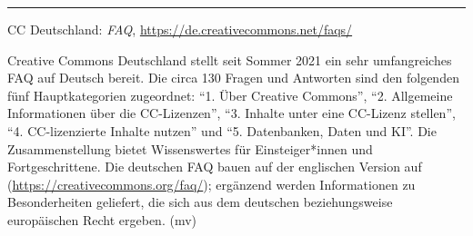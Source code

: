 \documentclass[a4paper,
fontsize=11pt,
oneside,
numbers=noperiodatend,
parskip=half-,
bibliography=totoc,
final
]{scrartcl}
\begin{document}
\begin{center}\rule{0.5\linewidth}{0.5pt}\end{center}

CC Deutschland: \emph{FAQ}, \url{https://de.creativecommons.net/faqs/}

Creative Commons Deutschland stellt seit Sommer 2021 ein sehr
umfangreiches FAQ auf Deutsch bereit. Die circa 130 Fragen und Antworten
sind den folgenden fünf Hauptkategorien zugeordnet: \enquote{1. Über
Creative Commons}, \enquote{2. Allgemeine Informationen über die
CC-Lizenzen}, \enquote{3. Inhalte unter eine CC-Lizenz stellen},
\enquote{4. CC-lizenzierte Inhalte nutzen} und \enquote{5. Datenbanken,
Daten und KI}. Die Zusammenstellung bietet Wissenswertes für
Einsteiger*innen und Fortgeschrittene. Die deutschen FAQ bauen auf der
englischen Version auf
(\url{https://creativecommons.org/faq/});
ergänzend werden Informationen zu Besonderheiten geliefert, die sich aus
dem deutschen beziehungsweise europäischen Recht ergeben. (mv)

\end{document}
